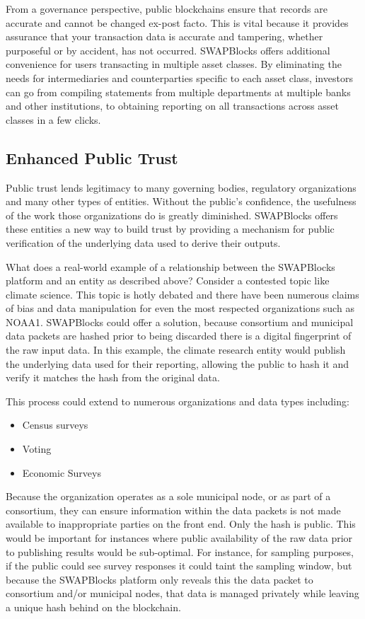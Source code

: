 \documentclass[12pt]{article}
\begin{document}
From a governance perspective, public blockchains ensure that records are accurate and cannot be changed ex-post facto. This is vital because it provides assurance that your transaction data is accurate and tampering, whether purposeful or by accident, has not occurred. SWAPBlocks offers additional convenience for users transacting in multiple asset classes. By eliminating the needs for intermediaries and counterparties specific to each asset class, investors can go from compiling statements from multiple departments at multiple banks and other institutions, to obtaining reporting on all transactions across asset classes in a few clicks.

\subsection{Enhanced Public Trust}
Public trust lends legitimacy to many governing bodies, regulatory organizations and many other types of entities. Without the public’s confidence, the usefulness of the work those organizations do is greatly diminished. SWAPBlocks offers these entities a new way to build trust by providing a mechanism for public verification of the underlying data used to derive their outputs.

What does a real-world example of a relationship between the SWAPBlocks platform and an entity as described above? Consider a contested topic like climate science. This topic is hotly debated and there have been numerous claims of bias and data manipulation for even the most respected organizations such as NOAA1. SWAPBlocks could offer a solution, because consortium and municipal data packets are hashed prior to being discarded there is a digital fingerprint of the raw input data. In this example, the climate research entity would publish the underlying data used for their reporting, allowing the public to hash it and verify it matches the hash from the original data.

This process could extend to numerous organizations and data types including:

\begin{itemize}
	\item{Census surveys}
	\item{Voting}
	\item{Economic Surveys}
\end{itemize}

Because the organization operates as a sole municipal node, or as part of a consortium, they can ensure information within the data packets is not made available to inappropriate parties on the front end. Only the hash is public. This would be important for instances where public availability of the raw data prior to publishing results would be sub-optimal. For instance, for sampling purposes, if the public could see survey responses it could taint the sampling window, but because the SWAPBlocks platform only reveals this the data packet to consortium and/or municipal nodes, that data is managed privately while leaving a unique hash behind on the blockchain.
\end{document}
